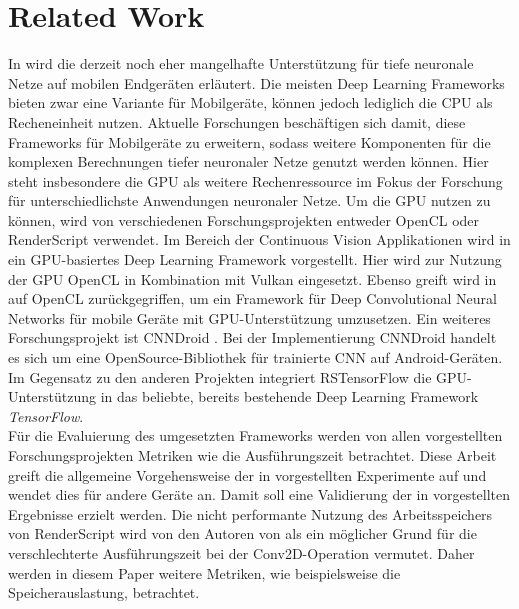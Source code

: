 \section{Related Work}
\label{sec:relatedwork}
In \cite{rstensorflow2017} wird die derzeit noch eher mangelhafte Unterstützung für tiefe neuronale Netze auf mobilen Endgeräten erläutert. Die meisten Deep Learning Frameworks bieten zwar eine Variante für Mobilgeräte, können jedoch lediglich die CPU als Recheneinheit nutzen. Aktuelle Forschungen beschäftigen sich damit, diese Frameworks für Mobilgeräte zu erweitern, sodass weitere Komponenten für die komplexen Berechnungen tiefer neuronaler Netze genutzt werden können. Hier steht insbesondere die GPU als weitere Rechenressource im Fokus der Forschung für unterschiedlichste Anwendungen neuronaler Netze. Um die GPU nutzen zu können, wird von verschiedenen Forschungsprojekten entweder OpenCL \cite{opencl} oder RenderScript \cite{renderscript} verwendet. Im Bereich der  Continuous Vision Applikationen wird in \cite{deepmon2017} ein GPU-basiertes Deep Learning Framework vorgestellt. Hier wird zur Nutzung der GPU OpenCL \cite{opencl} in Kombination mit Vulkan \cite{vulkan} eingesetzt. Ebenso greift wird in \cite{deepsense2016} auf OpenCL \cite{opencl} zurückgegriffen, um ein Framework für Deep Convolutional Neural Networks für mobile Geräte mit GPU-Unterstützung umzusetzen. Ein weiteres Forschungsprojekt ist CNNDroid \cite{cnndroid2016}. Bei der Implementierung CNNDroid handelt es sich um eine OpenSource-Bibliothek für trainierte CNN auf Android-Geräten. Im Gegensatz zu den anderen Projekten integriert RSTensorFlow die GPU-Unterstützung in das beliebte, bereits bestehende Deep Learning Framework \textit{TensorFlow}. \\
Für die Evaluierung des umgesetzten Frameworks werden von allen vorgestellten Forschungsprojekten Metriken wie die Ausführungszeit betrachtet. Diese Arbeit greift die allgemeine Vorgehensweise der in \cite{rstensorflow2017} vorgestellten Experimente auf und wendet dies für andere Geräte an. Damit soll eine Validierung der in \cite{rstensorflow2017} vorgestellten Ergebnisse erzielt werden. Die nicht performante Nutzung des Arbeitsspeichers von RenderScript wird von den Autoren von \cite{rstensorflow2017} als ein möglicher Grund für die verschlechterte Ausführungszeit bei der Conv2D-Operation vermutet. Daher werden in diesem Paper weitere Metriken, wie beispielsweise die Speicherauslastung, betrachtet. 